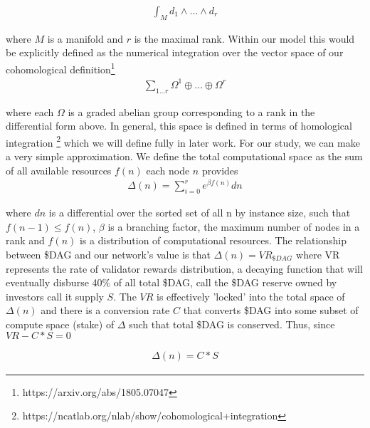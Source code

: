 \documentclass{article}
\begin{document}
\begin{equation*} \label{eq1}
\begin{split}
\int_M d_1\wedge \dots \wedge d_r
\end{split}
\end{equation*}

where $M$ is a manifold and $r$ is the maximal rank. Within our model this would be explicitly defined as the numerical integration over the vector space of our cohomological definition\footnote{https://arxiv.org/abs/1805.07047}
\begin{equation*} \label{eq1}
\begin{split}
\sum_{1 \dots r} \Omega^1 \oplus \dots \oplus \Omega^r
\end{split}
\end{equation*}

where each $\Omega$ is a graded abelian group corresponding to a rank in the differential form above. In general, this space is defined in terms of homological integration \footnote{https://ncatlab.org/nlab/show/cohomological+integration} which we will define fully in later work. For our study, we can make a very simple approximation. We define the total computational space as the sum of all available resources $f(n)$ each node $n$ provides
\begin{equation*} \label{eq1}
\begin{split}
\Delta(n) = \sum_{i=0}^r e^{\beta f(n)} dn
\end{split}
\end{equation*}

where $dn$ is a differential over the sorted set of all n by instance size, such that $f(n-1) \leq f(n)$, $\beta$ is a branching factor, the maximum number of nodes in a rank and $f(n)$ is a distribution of computational resources. The relationship between \$DAG and our network's value is that $\Delta(n) = VR_{\$DAG}$ where VR represents the rate of validator rewards distribution, a decaying function that will eventually disburse 40\% of all total \$DAG, call the \$DAG reserve owned by investors call it supply $S$. The $VR$ is effectively 'locked' into the total space of $\Delta(n)$ and there is a conversion rate $C$ that converts \$DAG into some subset of compute space (stake) of $\Delta$ such that total \$DAG is conserved. Thus, since $VR - C*S = 0$ 

\begin{equation*} \label{eq1}
\begin{split}
\Delta(n) = C* S
\end{split}
\end{equation*}
\end{document}
